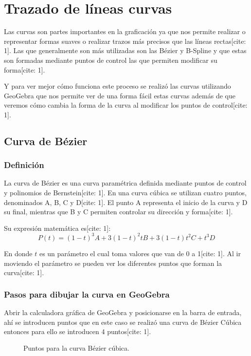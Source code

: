 \documentclass[12pt,letterpaper]{article}
\begin{document}
\section{Trazado de líneas curvas}
\label{sec:trazado_curvas}

Las curvas son partes importantes en la graficación ya que nos permite realizar o representar formas suaves o realizar trazos más precisos que las líneas rectas[cite: 1]. Las que generalmente son más utilizadas son las Bézier y B-Spline y que estas son formadas mediante puntos de control las que permiten modificar su forma[cite: 1].

Y para ver mejor cómo funciona este proceso se realizó las curvas utilizando GeoGebra que nos permite ver de una forma fácil estas curvas además de que veremos cómo cambia la forma de la curva al modificar los puntos de control[cite: 1].

\subsection{Curva de Bézier}

\subsubsection{Definición}
La curva de Bézier es una curva paramétrica definida mediante puntos de control y polinomios de Bernstein[cite: 1]. En una curva cúbica se utilizan cuatro puntos, denominados A, B, C y D[cite: 1]. El punto A representa el inicio de la curva y D su final, mientras que B y C permiten controlar su dirección y forma[cite: 1].

Su expresión matemática es[cite: 1]:
$$ P(t) = (1 - t)^3 A + 3(1 - t)^2 t B + 3(1 - t) t^2 C + t^3 D $$

En donde $t$ es un parámetro el cual toma valores que van de 0 a 1[cite: 1]. Al ir moviendo el parámetro se pueden ver los diferentes puntos que forman la curva[cite: 1].

\subsubsection{Pasos para dibujar la curva en GeoGebra}
Abrir la calculadora gráfica de GeoGebra y posicionarse en la barra de entrada, ahí se introducen puntos que en este caso se realizó una curva de Bézier Cúbica entonces para ello se introducen 4 puntos[cite: 1].

\begin{figure}[H]
    \centering
    \caption{Puntos para la curva Bézier cúbica.}
    \label{fig:puntos_bezier}
\end{figure}
\end{document}
